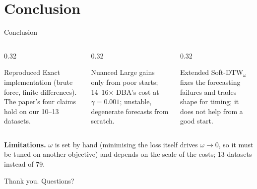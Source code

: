 \documentclass[aspectratio=169,11pt]{beamer}
\begin{document}
\section{Conclusion}
\begin{frame}{Conclusion}
\begin{columns}[T]
\begin{column}{0.32\textwidth}
\begin{block}{Reproduced}
Exact implementation (brute force, finite differences). The paper's four claims hold on our 10--13 datasets.
\end{block}
\end{column}
\begin{column}{0.32\textwidth}
\begin{block}{Nuanced}
Large gains only from poor starts; 14--16$\times$ DBA's cost at $\gamma=0.001$; unstable, degenerate forecasts from scratch.
\end{block}
\end{column}
\begin{column}{0.32\textwidth}
\begin{block}{Extended}
Soft-DTW$_\omega$ fixes the forecasting failures and trades shape for timing; it does not help from a good start.
\end{block}
\end{column}
\end{columns}
\vspace{0.5cm}
\textbf{Limitations.} $\omega$ is set by hand (minimising the loss itself drives $\omega\to0$, so it must be tuned on another objective) and depends on the scale of the costs; 13 datasets instead of 79.
\vspace{0.6cm}
\begin{center}
{\Large Thank you. Questions?}
\end{center}
\end{frame}
\end{document}
